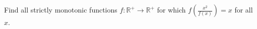 Find all strictly monotonic functions $f: \mathbb{R}^+\rightarrow\mathbb{R}^+$ for which $f\left(\frac{x^2}{f(x)}\right)=x$ for all $x$.
